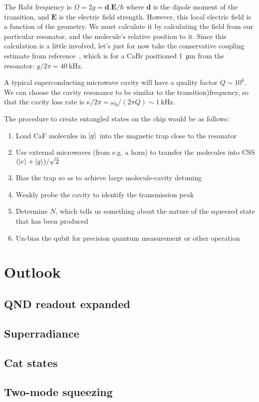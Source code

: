 The Rabi frequency is $\Omega = 2g = \mathbf{d}.\mathbf{E}/\hbar$ where $\mathbf{d}$
is the dipole moment of the transition, and $\mathbf{E}$ is the electric field
strength. However, this local electric field is a function of the geometry. We
must calculate it by calculating the field from our particular resonator, and
the molecule's relative position to it. Since this calculation is a little
involved, let's just for now take the conservative coupling estimate from
reference~\cite{Andre2006}, which is for a CaBr positioned
\SI{1}{\micro\meter} from the resonator: $g/2\pi = \SI{40}{\kilo\hertz}$.

A typical superconducting microwave cavity will have a quality factor
$Q\sim10^6$. We can choose the cavity resonance to be similar to the
transition)frequency, so that the cavity loss rate is $\kappa/2\pi =
\omega_0/(2\pi Q) \sim \SI{1}{\kilo\hertz}$. 

The procedure to create entangled states on the chip would be as follows:

\begin{enumerate}
  \item Load CaF molecules in $\ket{g}$ into the magnetic trap close to the
    resonator
  \item Use external microwaves (from e.g. a horn) to transfer the molecules
    into CSS $(\ket{e} + \ket{g})/\sqrt{2}$
  \item Bias the trap so as to achieve large molecule-cavity detuning
  \item Weakly probe the cavity to identify the transmission peak
  \item Determine $N$, which tells us something about the nature of the
    squeezed state that has been produced
  \item Un-bias the qubit for precision quantum measurement or other operation
\end{enumerate}

\section{Outlook}

\subsection{QND readout expanded}


\subsection{Superradiance}

\subsection{Cat states}

\subsection{Two-mode squeezing}

